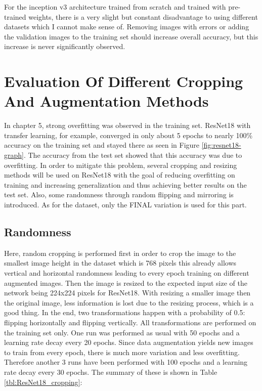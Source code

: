 For the inception v3 architecture trained from scratch and trained with pre-trained weights, there is a very slight but constant disadvantage to using different datasets which I cannot make sense of. Removing images with errors or adding the validation images to the training set should increase overall accuracy, but this increase is never significantly observed.












\section{Evaluation Of Different Cropping And Augmentation Methods}

In chapter 5, strong overfitting was observed in the training set. ResNet18 with transfer learning, for example, converged in only about 5 epochs to nearly 100\% accuracy on the training set and stayed there as seen in Figure \ref{fig:resnet18-graph}. The accuracy from the test set showed that this accuracy was due to overfitting. In order to mitigate this problem, several cropping and resizing methods will be used on ResNet18 with the goal of reducing overfitting on training and increasing generalization and thus achieving better results on the test set. Also, some randomness through random flipping and mirroring is introduced. As for the dataset, only the FINAL variation is used for this part.

\subsection{Randomness}

Here, random cropping is performed first in order to crop the image to the smallest image height in the dataset which is 768 pixels this already allows vertical and horizontal randomness leading to every epoch training on different augmented images. Then the image is resized to the expected input size of the network being 224x224 pixels for ResNet18. With resizing a  smaller image then the original image, less information is lost due to the resizing process, which is a good thing. In the end, two transformations happen with a probability of 0.5: flipping horizontally and flipping vertically. All transformations are performed on the training set only. One run was performed as usual with 50 epochs and a  learning rate decay every 20 epochs. Since data augmentation yields new images to train from every epoch, there is much more variation and less overfitting. Therefore another 3 runs have been performed with 100 epochs and a learning rate decay every  30 epochs. The summary of these is shown in Table \ref{tbl:ResNet18_cropping}: \\


